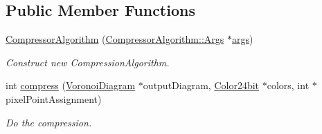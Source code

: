 \subsection*{Public Member Functions}
\begin{DoxyCompactItemize}
\item 
\hyperlink{classlossycompressor_1_1_compressor_algorithm_a4b98b46955df2877eb714c36b573faa9}{Compressor\+Algorithm} (\hyperlink{structlossycompressor_1_1_compressor_algorithm_1_1_args}{Compressor\+Algorithm\+::\+Args} $\ast$\hyperlink{classlossycompressor_1_1_compressor_algorithm_a7cec23bc2a41ac35617e21466a2f0c46}{args})\hypertarget{classlossycompressor_1_1_compressor_algorithm_a4b98b46955df2877eb714c36b573faa9}{}\label{classlossycompressor_1_1_compressor_algorithm_a4b98b46955df2877eb714c36b573faa9}

\begin{DoxyCompactList}\small\item\em Construct new Compression\+Algorithm. \end{DoxyCompactList}\item 
int \hyperlink{classlossycompressor_1_1_compressor_algorithm_a651e1dd7ef3df5e46a4aad73a8de4c8d}{compress} (\hyperlink{structlossycompressor_1_1_voronoi_diagram}{Voronoi\+Diagram} $\ast$output\+Diagram, \hyperlink{structlossycompressor_1_1_color24bit}{Color24bit} $\ast$colors, int $\ast$pixel\+Point\+Assignment)
\begin{DoxyCompactList}\small\item\em Do the compression. \end{DoxyCompactList}\end{DoxyCompactItemize}
